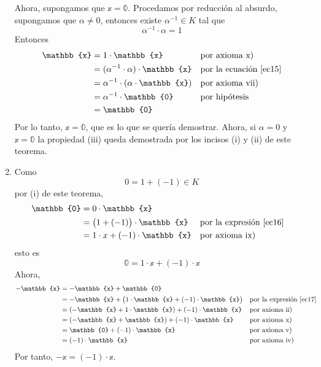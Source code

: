 \begin{theorem}
\begin{enumerate}[label=\roman*.]
        Ahora, supongamos que $\mathbb{x} = \mathbb{0}$. Procedamos por reducción al absurdo, supongamos que $\alpha \neq 0$, entonces existe $\alpha^{-1} \in K$ tal que \begin{equation}
            \alpha^{-1} \cdot \alpha = 1 \label{ec15}
        \end{equation}
        Entonces
        \begin{align*}
            \mathbb{x} & = 1 \cdot \mathbb{x} && \text{por axioma x)} \\
            & = (\alpha^{-1} \cdot \alpha) \cdot \mathbb{x} && \text{por la ecuación \eqref{ec15}} \\
            & = \alpha^{-1} \cdot (\alpha \cdot \mathbb{x}) && \text{por axioma vii)} \\
            & = \alpha^{-1} \cdot \mathbb{0} && \text{por hipótesis} \\
            & = \mathbb{0}
        \end{align*}
        Por lo tanto, $\mathbb{x} = \mathbb{0}$, que es lo que se quería demostrar. Ahora, si $\alpha = 0$ y $\mathbb{x} = \mathbb{0}$ la propiedad (iii) queda demostrada por los incisos (i) y (ii) de este teorema.
        \item Como
        \begin{equation}
            0 = 1 + (-1) \in K \label{ec16}
        \end{equation}
        por (i) de este teorema,
        \begin{align*}
            \mathbb{0} & = 0 \cdot \mathbb{x} \\
            & = \big( 1 + (-1) \big) \cdot \mathbb{x} && \text{por la expresión \eqref{ec16}} \\
            & = 1 \cdot x +  (-1) \cdot \mathbb{x} && \text{por axioma ix)}
        \end{align*}
        esto es
        \begin{equation}
            \mathbb{0} = 1 \cdot \mathbb{x} + (-1) \cdot \mathbb{x} \label{ec17}
        \end{equation}
        Ahora,
        \begin{align*}
            -\mathbb{x} & = - \mathbb{x} + \mathbb{0} \\
            & = -\mathbb{x} + \big( 1 \cdot \mathbb{x} + (-1) \cdot \mathbb{x} \big) && \text{por la expresión \eqref{ec17}} \\
            & = (-\mathbb{x} + 1 \cdot \mathbb{x}) + (-1) \cdot \mathbb{x} && \text{por axioma ii)} \\
            & = (-\mathbb{x} + \mathbb{x}) + (-1) \cdot \mathbb{x} && \text{por axioma x)} \\
            & = \mathbb{0} + (-1) \cdot \mathbb{x} && \text{por axioma v)} \\
            & = (-1) \cdot \mathbb{x} && \text{por axioma iv)}
        \end{align*}
        Por tanto, $-\mathbb{x} = (-1) \cdot \mathbb{x}$.
    \end{enumerate}
\end{theorem}

